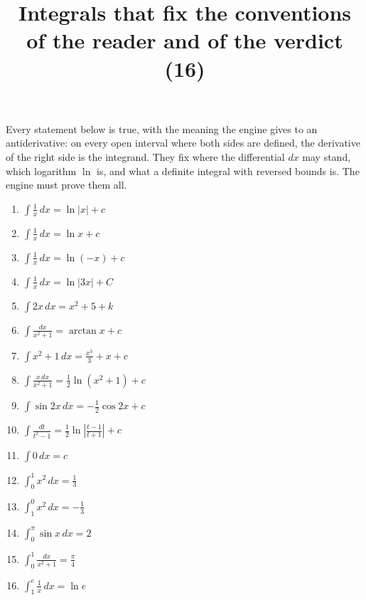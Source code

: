 \documentclass[11pt,a4paper]{article}
\title{Integrals that fix the conventions of the reader and of the verdict (16)}
\author{}
\date{}
\begin{document}
\maketitle
Every statement below is true, with the meaning the engine gives to an antiderivative: on every open interval where both sides are defined, the derivative of the right side is the integrand. They fix where the differential $dx$ may stand, which logarithm $\ln$ is, and what a definite integral with reversed bounds is. The engine must prove them all.

\begin{enumerate}
\item $\displaystyle \int \frac{1}{x} \, dx = \ln|x| + c$
\item $\displaystyle \int \frac{1}{x} \, dx = \ln x + c$
\item $\displaystyle \int \frac{1}{x} \, dx = \ln(-x) + c$
\item $\displaystyle \int \frac{1}{x} \, dx = \ln\left|3x\right| + C$
\item $\displaystyle \int 2x \, dx = x^{2} + 5 + k$
\item $\displaystyle \int \frac{dx}{x^{2} + 1} = \arctan x + c$
\item $\displaystyle \int x^{2} + 1 \, dx = \frac{x^{3}}{3} + x + c$
\item $\displaystyle \int \frac{x \, dx}{x^{2} + 1} = \frac{1}{2}\ln\left(x^{2} + 1\right) + c$
\item $\displaystyle \int \sin 2x \, dx = -\frac{1}{2}\cos 2x + c$
\item $\displaystyle \int \frac{dt}{t^{2} - 1} = \frac{1}{2}\ln\left|\frac{t - 1}{t + 1}\right| + c$
\item $\displaystyle \int 0 \, dx = c$
\item $\displaystyle \int_{0}^{1} x^{2} \, dx = \frac{1}{3}$
\item $\displaystyle \int_{1}^{0} x^{2} \, dx = -\frac{1}{3}$
\item $\displaystyle \int^{\pi}_{0} \sin x \, dx = 2$
\item $\displaystyle \int_{0}^{1} \frac{dx}{x^{2} + 1} = \frac{\pi}{4}$
\item $\displaystyle \int_{1}^{e} \frac{1}{x} \, dx = \ln e$
\end{enumerate}
\end{document}
